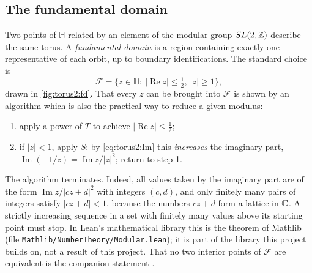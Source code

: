 \subsection{The fundamental domain}

Two points of $\mathbb H$ related by an element of the modular group $SL(2,\mathbb{Z})$ describe the same torus. A
\emph{fundamental domain} is a region containing exactly one
representative of each orbit, up to boundary identifications. The standard choice is
\begin{equation}\label{eq:torus2:F}
 \mathcal F=\big\{z\in\mathbb H:\ |\operatorname{Re}z|\le\tfrac12,\ |z|\ge1\big\},
\end{equation}
drawn in \cref{fig:torus2:fd}. That every $z$ can be brought into $\mathcal F$ is shown by
an algorithm which is also the practical way to reduce a given modulus:
\begin{enumerate}[nosep]
\item apply a power of $T$ to achieve $|\operatorname{Re}z|\le\frac12$;
\item if $|z|<1$, apply $S$: by \eqref{eq:torus2:Im} this \emph{increases} the imaginary
part, $\operatorname{Im}(-1/z)=\operatorname{Im}z/|z|^2$; return to step 1.
\end{enumerate}
The algorithm terminates. Indeed, all values taken by the imaginary part are of the form
$\operatorname{Im}z/|cz+d|^2$ with integers $(c,d)$, and only finitely many pairs of integers
satisfy $|cz+d|<1$, because the numbers $cz+d$ form a lattice in $\mathbb{C}$. A strictly
increasing sequence in a set with finitely many values above its starting point must stop.
In Lean's mathematical library this is the theorem 
of Mathlib (file \texttt{Mathlib/NumberTheory/Modular.lean}); it is part of the library this
project builds on, not a result of this project. That no two interior points of
$\mathcal F$ are equivalent is the companion statement
.

